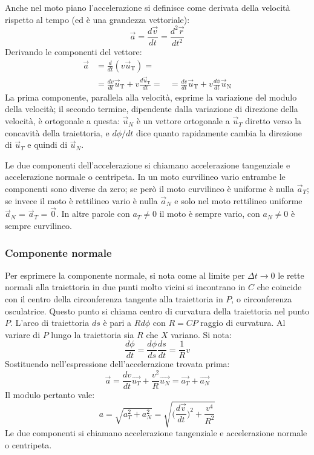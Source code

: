 \documentclass[class=book, crop=false, oneside, 12pt]{standalone}
\begin{document}
  Anche nel moto piano l'accelerazione si definisce come derivata della velocità rispetto al tempo (ed è una grandezza vettoriale):
  \begin{equation}
   \overrightarrow{a} = \frac{d \overrightarrow{v}}{dt} = \frac{d^2 \overrightarrow{r}}{dt^2}
  \end{equation}
  Derivando le componenti del vettore:
  \begin{align}
    \overrightarrow{a}&=\frac{d}{d t}\left(v \overrightarrow{u}_{\mathrm{T}}\right)=\\
                      &=\frac{d v}{d t} \overrightarrow{u}_{\mathrm{T}}+v \frac{d \overrightarrow{u}_{\mathrm{T}}}{d t}=
                      &=\frac{d v}{d t} \overrightarrow{u}_{\mathrm{T}}+v \frac{d \phi}{d t} \overrightarrow{u}_{\mathrm{N}}
  \end{align}
  La prima componente, parallela alla velocità, esprime la variazione del modulo della velocità; il secondo termine, dipendente dalla variazione di direzione della velocità, è ortogonale a questa: \(\overrightarrow{u}_N\) è un vettore ortogonale a \(\overrightarrow{u}_T\) diretto verso la concavità della traiettoria, e \(d \phi/dt \) dice quanto rapidamente cambia la direzione di \(\overrightarrow{u}_T\)  e quindi di \(\overrightarrow{u}_N\).

  Le due componenti dell'accelerazione si chiamano accelerazione tangenziale e accelerazione normale o centripeta.
  In un moto curvilineo vario entrambe le componenti sono diverse da zero; se però il moto curvilineo è uniforme è nulla \(\overrightarrow{a}_T\); se invece il moto è rettilineo vario è nulla \(\overrightarrow{a}_N\) e solo nel moto rettilineo uniforme \(\overrightarrow{a}_N\) = \(\overrightarrow{a}_T\) = \(\overrightarrow{0}\).
  In altre parole con \(a_T \neq 0\) il moto è sempre vario, con \(a_N \neq 0\) è  sempre curvilineo.
		\subsubsection{Componente normale}
			Per esprimere la componente normale, si nota come al limite per $\Delta t\rightarrow 0$ le rette normali alla traiettoria in due punti molto vicini si incontrano in $C$ che coincide con il centro della circonferenza tangente alla traiettoria in $P$, o circonferenza osculatrice.
			Questo punto si chiama centro di curvatura della traiettoria nel punto $P$.
			L'arco di traiettoria $ds$ \`e pari a $Rd\phi$ con $R=CP$ raggio di curvatura.
			Al variare di $P$ lungo la traiettoria sia $R$ che $X$ variano.
			Si nota:
			$$\dfrac{d\phi}{dt}=\dfrac{d\phi}{ds}\dfrac{ds}{dt}=\dfrac{1}{R}v$$
			Sostituendo nell'espressione dell'accelerazione trovata prima:
      $$\overrightarrow{a}=\dfrac{dv}{dt}\overrightarrow{u_T}+\dfrac{v^2}{R}\overrightarrow{u_N}=\overrightarrow{a_T}+\overrightarrow{a_N}$$
			Il modulo pertanto vale:
      $$a=\sqrt{a^2_T+a^2_N}=\sqrt{\biggl(\dfrac{d\overrightarrow{v}}{dt}\biggr)^2+\dfrac{v^4}{R^2}}$$
			Le due componenti si chiamano accelerazione tangenziale e accelerazione normale o centripeta.
\end{document}
